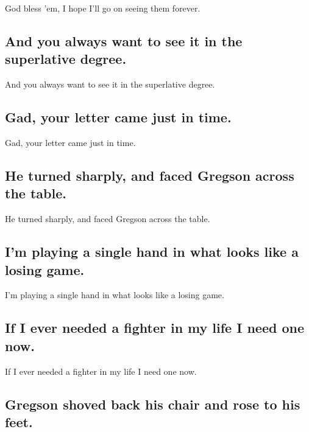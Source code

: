 \documentclass[]{article}
\begin{document}
God bless 'em, I hope I'll go on seeing them forever.

\hypertarget{and-you-always-want-to-see-it-in-the-superlative-degree.}{%
\subsection{And you always want to see it in the superlative
degree.}\label{and-you-always-want-to-see-it-in-the-superlative-degree.}}

And you always want to see it in the superlative degree.

\hypertarget{gad-your-letter-came-just-in-time.}{%
\subsection{Gad, your letter came just in
time.}\label{gad-your-letter-came-just-in-time.}}

Gad, your letter came just in time.

\hypertarget{he-turned-sharply-and-faced-gregson-across-the-table.}{%
\subsection{He turned sharply, and faced Gregson across the
table.}\label{he-turned-sharply-and-faced-gregson-across-the-table.}}

He turned sharply, and faced Gregson across the table.

\hypertarget{im-playing-a-single-hand-in-what-looks-like-a-losing-game.}{%
\subsection{I'm playing a single hand in what looks like a losing
game.}\label{im-playing-a-single-hand-in-what-looks-like-a-losing-game.}}

I'm playing a single hand in what looks like a losing game.

\hypertarget{if-i-ever-needed-a-fighter-in-my-life-i-need-one-now.}{%
\subsection{If I ever needed a fighter in my life I need one
now.}\label{if-i-ever-needed-a-fighter-in-my-life-i-need-one-now.}}

If I ever needed a fighter in my life I need one now.

\hypertarget{gregson-shoved-back-his-chair-and-rose-to-his-feet.}{%
\subsection{Gregson shoved back his chair and rose to his
feet.}\label{gregson-shoved-back-his-chair-and-rose-to-his-feet.}}
\end{document}
